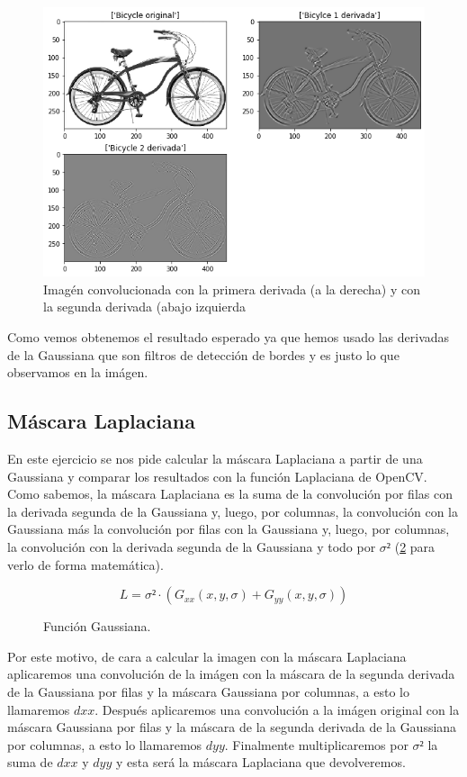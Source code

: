 \documentclass[12pt,spanish]{article}
\begin{document}
\begin{figure}[H]
	\centering
	\includegraphics[width=\textwidth]{./imagenes_memoria/bycicle_derivadas.png}
	\caption{Imagén convolucionada con la primera derivada (a la derecha) y con la segunda derivada (abajo izquierda}
	\label{conv_1y2d_bycicle}
\end{figure}

Como vemos obtenemos el resultado esperado ya que hemos usado las derivadas de la Gaussiana que son filtros de detección de bordes y es justo lo que observamos en la imágen.

\subsection{Máscara Laplaciana}
En este ejercicio se nos pide calcular la máscara Laplaciana a partir de una Gaussiana y comparar los resultados con la función Laplaciana de OpenCV. \\

Como sabemos, la máscara Laplaciana es la suma de la convolución por filas con la derivada segunda de la Gaussiana y, luego, por columnas, la convolución con la Gaussiana más la convolución por filas con la Gaussiana y, luego, por columnas, la convolución con la derivada segunda de la Gaussiana y todo por $\sigma²$ (\ref{f_laplaciana} para verlo de forma matemática).

\begin{figure}[H]
	\centering
	\[L = \sigma² \cdot (G_{xx}(x,y,\sigma) + G_{yy}(x,y,\sigma)) \]
	\caption{Función Gaussiana.}
	\label{f_laplaciana}
\end{figure}

Por este motivo, de cara a calcular la imagen con la máscara Laplaciana aplicaremos una convolución de la imágen con la máscara de la segunda derivada de la Gaussiana por filas y la máscara Gaussiana por columnas, a esto lo llamaremos $dxx$. Después aplicaremos una convolución a la imágen original con la máscara Gaussiana por filas y la máscara de la segunda derivada de la Gaussiana por columnas, a esto lo llamaremos $dyy$. Finalmente multiplicaremos por $\sigma²$ la suma de $dxx$ y $dyy$ y esta será la máscara Laplaciana que devolveremos. \\
\end{document}
